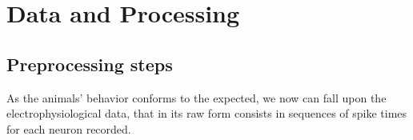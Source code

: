 \chapter{Data and Processing}
\section{Preprocessing steps}
As the animals' behavior conforms to the expected, we now can fall upon the electrophysiological data, that in its raw form consists in sequences of spike times for each neuron recorded.

